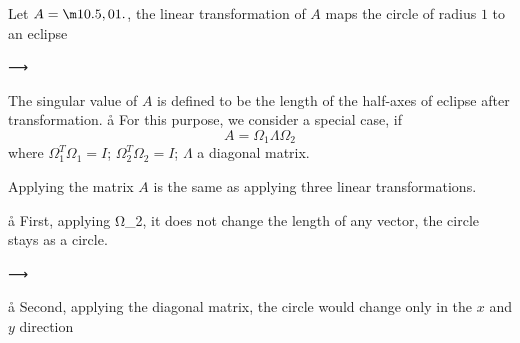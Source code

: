 

Let $A=\m1{0.5},01.$, the linear transformation of $A$ maps the circle of radius $1$ to an eclipse


⟶  

The singular value of $A$ is defined to be the length of the half-axes of eclipse after transformation. 
\a\aa
For this purpose, we consider a special case, if 
$$
A = Ω_1ΛΩ_2
$$
where $Ω_1^TΩ_1=I$;
$Ω_2^TΩ_2=I$;
$Λ$ a diagonal matrix.

\vfill

Applying the matrix $A$ is the same as applying three linear transformations.

\a\aa
First, applying Ω_2, it does not change the length of any vector, the circle stays as a circle.

⟶  
\a\aa
Second, applying the diagonal matrix, the circle would change only in the $x$ and $y$ direction

